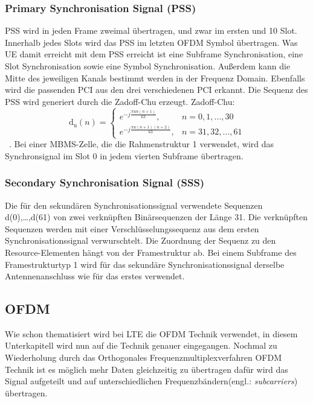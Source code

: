 \subsubsection{Primary Synchronisation Signal (PSS)}
 PSS wird in jeden Frame zweimal übertragen, und zwar im ersten und 10 Slot. Innerhalb jedes Slots wird das PSS im letzten OFDM Symbol übertragen. Was UE damit erreicht mit dem PSS erreicht ist eine Subframe Synchronisation, eine Slot Synchronisation sowie eine Symbol Synchronisation. Außerdem kann die Mitte des jeweiligen Kanals bestimmt werden in der Frequenz Domain. Ebenfalls wird die passenden PCI aus den drei verschiedenen PCI erkannt.
 Die Sequenz des PSS wird generiert durch die Zadoff-Chu erzeugt. Zadoff-Chu:
\begin{equation}
    \operatorname{d_u}(n)=\begin{cases} e^{-j\frac{\pi un(n+1)}{63}}, & n=0,1,...,30 \\ e^{-j\frac{\pi u(n+1)(n+2)}{63}}, & n=31,32,...,61 \end{cases}
\end{equation}
~\cite[S.~181]{etsi2021136}. Bei einer MBMS-Zelle, die die Rahmenstruktur 1 verwendet, wird das Synchronsignal im Slot 0 in jedem vierten Subframe übertragen.

\subsubsection{Secondary Synchronisation Signal (SSS)}
Die für den sekundären Synchronisationssignal verwendete Sequenzen d(0),…,d(61) von zwei verknüpften Binärsequenzen der Länge 31. Die verknüpften Sequenzen werden mit einer Verschlüsselungssequenz aus dem ersten Synchronisationssignal verwurschtelt. Die Zuordnung der Sequenz zu den Resource-Elementen hängt von der Framestruktur ab. Bei einem Subframe des Framestrukturtyp 1 wird für das sekundäre Synchronisationssignal derselbe Antennenanschluss wie für das erstes verwendet. ~\cite[S.~183]{etsi2021136}

\subsection{OFDM}
Wie schon thematisiert wird bei LTE die OFDM Technik verwendet, in diesem Unterkapitell wird nun auf die Technik genauer eingegangen. Nochmal zu Wiederholung durch das Orthogonales Frequenzmultiplexverfahren OFDM Technik ist es möglich mehr Daten gleichzeitig zu übertragen dafür wird das Signal aufgeteilt und auf unterschiedlichen Frequenzbändern(engl.: \textit{subcarriers}) übertragen.

